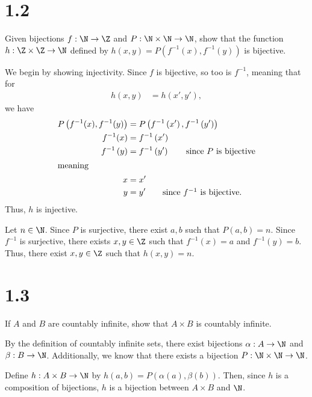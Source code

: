 \documentclass[11pt]{mypackage}
\begin{document}
\section{1.2}%
\begin{problem}
  Given bijections $f: \N\rightarrow \Z$ and $P: \N\times\N\rightarrow \N$, show that the function $h: \Z\times \Z \rightarrow \N$ defined by $h(x,y) = P\left(f^{-1}\left(x\right),f^{-1}\left(y\right)\right)$ is bijective.
\end{problem}
\begin{solution}
  We begin by showing injectivity. Since $f$ is bijective, so too is $f^{-1}$, meaning that for
  \begin{align*}
    h\left(x,y\right) &= h\left(x',y'\right),
  \end{align*}
  we have
  \begin{align*}
    P\left(f^{-1}(x),f^{-1}(y)\right) &= P\left(f^{-1}\left(x'\right),f^{-1}\left(y'\right)\right)\\
    f^{-1}(x) &= f^{-1}\left(x'\right)\\
    f^{-1}\left(y\right) &= f^{-1}\left(y'\right) \tag*{since $P$ is bijective}\\
    \intertext{meaning}
    x &= x'\\
    y &= y'\tag*{since $f^{-1}$ is bijective.}
  \end{align*}
  Thus, $h$ is injective.\newline

  Let $n\in \N$. Since $P$ is surjective, there exist $a,b$ such that $P\left(a,b\right) = n$. Since $f^{-1}$ is surjective, there exists $x,y\in \Z$ such that $f^{-1}\left(x\right) = a$ and $f^{-1}\left(y\right) = b$. Thus, there exist $x,y\in \Z$ such that $h\left(x,y\right) = n$.
\end{solution}
\section{1.3}%
\begin{problem}
  If $A$ and $B$ are countably infinite, show that $A\times B$ is countably infinite.%
\end{problem}
\begin{solution}
  By the definition of countably infinite sets, there exist bijections $\alpha: A\rightarrow \N$ and $\beta: B\rightarrow \N$. Additionally, we know that there exists a bijection $P: \N\times \N \rightarrow \N$.\newline

  Define $h: A\times B \rightarrow \N$ by $h(a,b) = P\left(\alpha\left(a\right),\beta\left(b\right)\right)$. Then, since $h$ is a composition of bijections, $h$ is a bijection between $A\times B$ and $\N$.
\end{solution}
\end{document}
